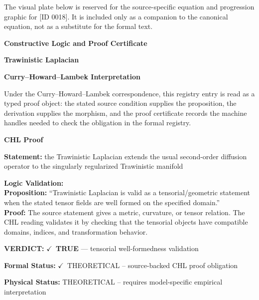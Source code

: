 \begingroup\footnotesize\sloppy
The visual plate below is reserved for the source-specific equation and progression graphic for [ID 0018]. It is included only as a companion to the canonical equation, not as a substitute for the formal text.
\par\endgroup
\ifTZPDarkEdition
{}
\fi

\clearpage
\begingroup\tzpsupportsetup
\noindent\textbf{\fontsize{10.8pt}{12.8pt}\selectfont [ID 0018] Constructive Logic and Proof Certificate}\par
\noindent\textbf{\fontsize{10pt}{12pt}\selectfont Trawinistic Laplacian}\par
\vspace{0.45em}
\begingroup
\footnotesize
\setlength{\parskip}{0.22em}
\setlength{\parindent}{0pt}
\noindent\textbf{Curry--Howard--Lambek Interpretation}\par
Under the Curry--Howard--Lambek correspondence, this registry entry is read as a typed proof
object: the stated source condition supplies the proposition, the derivation supplies the
morphism, and the proof certificate records the machine handles needed to check the obligation
in the formal registry.

\vspace{0.45em}
\noindent\textbf{CHL Proof}\par
\textbf{Statement:} the Trawinistic Laplacian extends the usual second-order diffusion operator to the
singularly regularized Trawinistic manifold

\textbf{Logic Validation:}\\
\textbf{Proposition:} ``Trawinistic Laplacian is valid as a tensorial/geometric statement when the stated tensor
fields are well formed on the specified domain.''\\
\textbf{Proof:} The source statement gives a metric, curvature, or tensor relation. The CHL reading
validates it by checking that the tensorial objects have compatible domains, indices,
and transformation behavior.

\textbf{VERDICT:} \ensuremath{\checkmark}\ \textbf{TRUE} --- tensorial well-formedness validation

\textbf{Formal Status:} \ensuremath{\checkmark}\ THEORETICAL -- source-backed CHL proof obligation

\textbf{Physical Status:} THEORETICAL -- requires model-specific empirical interpretation
\par\vspace{0.45em}
\par
\ifTZPDarkEdition
{}
\fi
\endgroup
\endgroup
